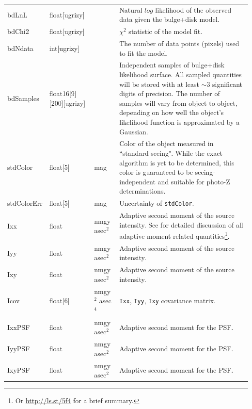 \documentclass[12pt]{article}
\begin{document}
\begin{center}
\begin{longtable}{p{3cm}p{2cm}p{2cm}p{5cm}}
bdLnL & float[ugrizy] & ~ & Natural $log$ likelihood of the observed data given the bulge+disk model. \\

bdChi2 & float[ugrizy] & ~ & $\chi^2$ statistic of the model fit. \\

bdNdata & int[ugrizy] & ~ & The number of data points (pixels) used to fit the model. \\

bdSamples & float16[9][200][ugrizy] & ~ & Independent samples of bulge+disk likelihood surface. All sampled quantities will be stored with at least $\sim 3$ significant digits of precision. The number of samples will vary from object to object, depending on how well the object's likelihood function is approximated by a Gaussian.\\

stdColor & float[5] & mag & Color of the object measured in ``standard seeing". While the exact algorithm is yet to be determined, this color is guaranteed to be seeing-independent and suitable for photo-Z determinations.\\

stdColorErr & float[5] & mag & Uncertainty of {\tt stdColor}. \\

Ixx & float & nmgy asec$^{2}$ & Adaptive second moment of the source intensity. See \citet{2002AJ....123..583B} for detailed discussion of all adaptive-moment related quantities\footnote{Or \url{http://ls.st/5f4} for a brief summary.}. \\

Iyy & float & nmgy asec$^{2}$ & Adaptive second moment of the source intensity. \\

Ixy & float & nmgy asec$^{2}$ & Adaptive second moment of the source intensity. \\

Icov & float[6] & nmgy$^{2}$ asec$^{4}$ & {\tt Ixx}, {\tt Iyy}, {\tt Ixy} covariance matrix. \\

IxxPSF & float & nmgy asec$^{2}$ & Adaptive second moment for the PSF. \\

IyyPSF & float & nmgy asec$^{2}$ & Adaptive second moment for the PSF. \\

IxyPSF & float & nmgy asec$^{2}$ & Adaptive second moment for the PSF. \\


\end{longtable}
\end{center}
\end{document}
